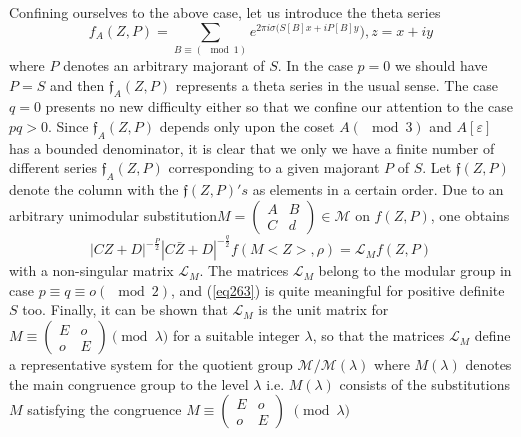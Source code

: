 Confining ourselves to the above case, let us introduce the theta
series  
\begin{equation*}
f_A (Z, P) = \sum_{ B \equiv (\mod 1)} e^{ 2 \pi i \sigma ( S[B] x + i
  P[B]y}), z = x + iy \tag{262}\label{eq262} 
\end{equation*}
where $P$ denotes an arbitrary majorant of $S$. In the case $ p = 0$
we should have $P = S$ and then $\mathfrak{f}_A (Z, P)$ represents a
theta series in the usual sense. The case $q = 
0$ presents no new difficulty either so that we confine our attention
to the case $ p q > 0$. Since $\mathfrak{f}_A (Z, P)$ depends only
upon the coset $A (\mod 3)$ and $A[\varepsilon]$ has a bounded
denominator, it is clear that we only we have a finite number of
different series $\mathfrak{f} _A (Z, P)$ corresponding to a given
majorant $P$ of $S$. Let $\mathfrak{f} (Z, P) $ denote the column with
the $\mathfrak{f} (Z, P)'s$ as elements in a certain order. Due to an
arbitrary unimodular substitution\pageoriginale $M=\begin{pmatrix} A &
B \\ C & d \end {pmatrix} \in \mathcal{M}$ on $f (Z,P)$, one obtains   
\begin{equation*}
|CZ+D|^{- \frac{P}{2}}|C \bar{Z}+D|^{-\frac{q}{2}} f (M < Z >, \rho) =
\mathcal{L}_M f(Z, P) \tag{263}\label{eq263} 
\end{equation*}
with a non-singular matrix $\mathscr{L}_M$. The matrices
$\mathscr{L}_M$ belong to the modular group in case $p \equiv q \equiv
o (\mod 2)$, and (\ref{eq263}) is quite meaningful for positive definite $S$
too. Finally, it can be shown that $\mathscr{L}_M$ is the unit matrix
for $M \equiv \begin{pmatrix} E & o \\ o & E \end {pmatrix}
\pmod{\lambda}$ for a suitable integer $\lambda$, so that the matrices 
$\mathscr{L}_M$ define a representative system for the quotient group
$\mathcal{M}/\mathcal{M}(\lambda)$ where $M (\lambda)$ denotes the
main congruence group to the level $\lambda$ i.e. $M (\lambda)$
consists of the substitutions $M$ satisfying the congruence $M
\equiv \begin{pmatrix} E & o \\ o & E \end {pmatrix}$ \; $\pmod{\lambda}$   

